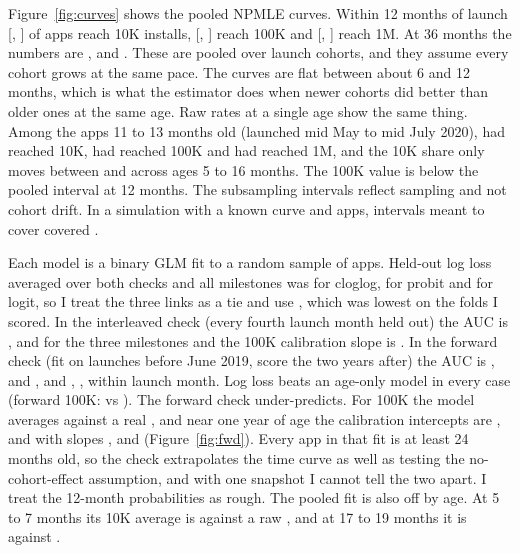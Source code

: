 \documentclass[11pt]{article}
\begin{document}
Figure~\ref{fig:curves} shows the pooled NPMLE curves. Within 12 months of launch \FTenKTwelve{}
[\FTenKTwelveLo, \FTenKTwelveHi] of apps reach 10K installs, \FHundredKTwelve{} [\FHundredKTwelveLo,
\FHundredKTwelveHi] reach 100K and \FOneMTwelve{} [\FOneMTwelveLo, \FOneMTwelveHi] reach 1M. At 36 months the
numbers are \FTenKThirtySix{}, \FHundredKThirtySix{} and \FOneMThirtySix{}. These are pooled over launch cohorts,
and they assume every cohort grows at the same pace. The curves are flat between about 6 and 12 months, which is what
the estimator does when newer cohorts did better than older ones at the same age. Raw rates at a single age show the
same thing. Among the \RawApps{} apps 11 to 13 months old (launched mid May to mid July 2020), \RawTenK{} had
reached 10K, \RawHundredK{} had reached 100K and \RawOneM{} had reached 1M, and the 10K share only moves between
\RawFlatLo{} and \RawFlatHi{} across ages 5 to 16 months. The 100K value is below the pooled interval at 12 months.
The subsampling intervals reflect sampling and not cohort drift. In a simulation with a known curve and
\NpmleSimApps{} apps, intervals meant to cover \NpmleSimNominal{} covered \NpmleSimCoverage{}.

Each model is a binary GLM fit to a random sample of \FitSample{} apps. Held-out log loss averaged over both checks and
all milestones was \LLCloglog{} for cloglog, \LLProbit{} for probit and \LLLogit{} for logit, so I treat the three links as a tie and use \Link{}, which was lowest on the folds I scored. In the interleaved check (every fourth launch month held out) the AUC is \IntAUCTenK{}, \IntAUCHundredK{} and
\IntAUCOneM{} for the three milestones and the 100K calibration slope is \IntSlopeHundredK{}. In the forward check
(fit on launches before June 2019, score the two years after) the AUC is \FwdAUCTenK{}, \FwdAUCHundredK{} and
\FwdAUCOneM{}, and \FwdWAUCTenK{}, \FwdWAUCHundredK{}, \FwdWAUCOneM{} within launch month. Log loss beats an age-only
model in every case (forward 100K: \FwdLLHundredK{} vs \FwdAgeLLHundredK{}). The forward check under-predicts. For 100K
the model averages \FwdMeanPredHundredK{} against a real \FwdRateHundredK{}, and near one year of age the calibration
intercepts are \FwdIntYearTenK{}, \FwdIntYearHundredK{} and \FwdIntYearOneM{} with slopes \FwdSlopeYearTenK{},
\FwdSlopeYearHundredK{} and \FwdSlopeYearOneM{} (Figure~\ref{fig:fwd}). Every app in that fit is at least 24 months
old, so the check extrapolates the time curve as well as testing the no-cohort-effect assumption, and with one
snapshot I cannot tell the two apart. I treat the 12-month probabilities as rough. The pooled fit is also off by age. At 5 to 7 months its 10K average is
\RawModelEarly{} against a raw \RawObsEarly{}, and at 17 to 19 months it is \RawModelLate{} against \RawObsLate{}.
\end{document}
